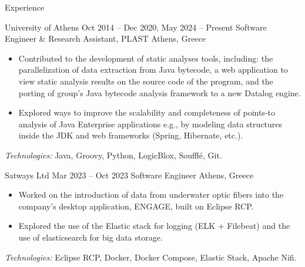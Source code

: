 \documentclass{resume}
\begin{document}
\begin{rSection}{Experience}
  \begin{rSubsection}
    {University of Athens}
    {Oct 2014 -- Dec 2020, May 2024 -- Present}
    {Software Engineer \& Research Assistant, PLAST}
    {Athens, Greece}
    \begin{itemize}[label={\color{accent}\textbullet}, leftmargin=1.5em, topsep=2pt]
      \setlength\itemsep{-0.2em}
      \item Contributed to the development of static analyses tools, including: the parallelization of data extraction from Java bytecode, a web application to view static analysis results on the source code of the program, and the porting of group's Java bytecode analysis framework to a new Datalog engine.
      \item Explored ways to improve the scalability and completeness of points-to analysis of Java Enterprise applications e.g., by modeling data structures inside the JDK and web frameworks (Spring, Hibernate, etc.).
    \end{itemize}
    \footnotesize\textcolor{TechsColor}{\textit{Technologies:} Java, Groovy, Python, LogicBlox, Souffl\'e, Git.}
  \end{rSubsection}

  \begin{rSubsection}
    {Satways Ltd}
    {Mar 2023 -- Oct 2023}
    {Software Engineer}
    {Athens, Greece}
    \begin{itemize}[label={\color{accent}\textbullet}, leftmargin=1.5em, topsep=2pt]
      \setlength\itemsep{-0.2em}
        \item Worked on the introduction of data from underwater optic fibers into the company's desktop application, ENGAGE, built on Eclipse RCP.
        \item Explored the use of the Elastic stack for logging (ELK + Filebeat) and the use of elasticsearch for big data storage.
    \end{itemize}
    \footnotesize\textcolor{TechsColor}{\textit{Technologies:} Eclipse RCP, Docker, Docker Compose, Elastic Stack, Apache Nifi.}
  \end{rSubsection}


\end{rSection}
\end{document}
